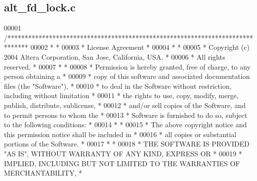 \subsection{alt\+\_\+fd\+\_\+lock.\+c}
\label{alt__fd__lock_8c_source}

\begin{DoxyCode}
00001 \textcolor{comment}{/******************************************************************************}
00002 \textcolor{comment}{*                                                                             *}
00003 \textcolor{comment}{* License Agreement                                                           *}
00004 \textcolor{comment}{*                                                                             *}
00005 \textcolor{comment}{* Copyright (c) 2004 Altera Corporation, San Jose, California, USA.           *}
00006 \textcolor{comment}{* All rights reserved.                                                        *}
00007 \textcolor{comment}{*                                                                             *}
00008 \textcolor{comment}{* Permission is hereby granted, free of charge, to any person obtaining a     *}
00009 \textcolor{comment}{* copy of this software and associated documentation files (the "Software"),  *}
00010 \textcolor{comment}{* to deal in the Software without restriction, including without limitation   *}
00011 \textcolor{comment}{* the rights to use, copy, modify, merge, publish, distribute, sublicense,    *}
00012 \textcolor{comment}{* and/or sell copies of the Software, and to permit persons to whom the       *}
00013 \textcolor{comment}{* Software is furnished to do so, subject to the following conditions:        *}
00014 \textcolor{comment}{*                                                                             *}
00015 \textcolor{comment}{* The above copyright notice and this permission notice shall be included in  *}
00016 \textcolor{comment}{* all copies or substantial portions of the Software.                         *}
00017 \textcolor{comment}{*                                                                             *}
00018 \textcolor{comment}{* THE SOFTWARE IS PROVIDED "AS IS", WITHOUT WARRANTY OF ANY KIND, EXPRESS OR  *}
00019 \textcolor{comment}{* IMPLIED, INCLUDING BUT NOT LIMITED TO THE WARRANTIES OF MERCHANTABILITY,    *}

\end{DoxyCode}
